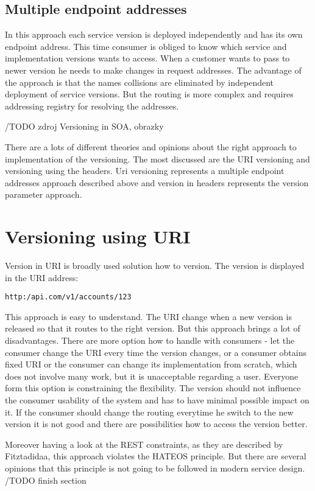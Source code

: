 \subsection{Multiple endpoint addresses}
In this approach each service version is deployed independently and has its own endpoint address. This time consumer is obliged to know which service and implementation versions wants to access. When a customer wants to pass to newer version he needs to make changes in request addresses. The advantage of the approach is that the names collisions are eliminated by independent deployment of service versions. But the routing is more complex and requires addressing registry for resolving the addresses.

/TODO zdroj Versioning in SOA, obrazky

There are a lots of different theories and opinions about the right approach to implementation of the versioning. The most discussed are the URI versioning and versioning using the headers. Uri versioning represents a multiple endpoint addresses approach described above and version in headers represents the version parameter approach.

\section{Versioning using URI}
Version in URI is broadly used solution how to version. The version is displayed in the URI address:

\texttt{http:/api.com/v1/accounts/123}

This approach is easy to understand. The URI change when a new version is released so that it routes to the right version. But this approach brings a lot of disadvantages. There are more option how to handle with consumers - let the consumer change the URI every time the version changes, or a consumer obtains fixed URI or the consumer can change its implementation from scratch, which does not involve many work, but it is unacceptable regarding a user.
Everyone form this option is constraining the flexibility.
The version should not influence the consumer usability of the system and has to have minimal possible impact on it. If the consumer should change the routing everytime he switch to the new version it is not good and there are possibilities how to access the version better.

Moreover having a look at the REST constraints, as they are described by Fitztadidaa, this approach violates the HATEOS principle. But there are several opinions that this principle is not going to be followed in modern service design. 
/TODO finish section 

